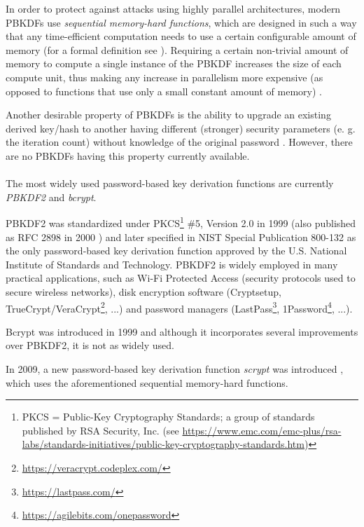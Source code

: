 \documentclass[12pt,oneside]{fithesis2}
\begin{document}
      In order to protect against attacks using highly parallel architectures, modern PBKDFs use \emph{sequential memory-hard functions}, which are designed in such a way that any time-efficient computation needs to use a certain configurable amount of memory (for a formal definition see \cite[chapter 4]{scrypt}). Requiring a certain non-trivial amount of memory to compute a single instance of the PBKDF increases the size of each compute unit, thus making any increase in parallelism more expensive (as opposed to functions that use only a small constant amount of memory) \cite{scrypt}.
      
      Another desirable property of PBKDFs is the ability to upgrade an existing derived key/hash to another having different (stronger) security parameters (e. g. the iteration count) without knowledge of the original password \cite{openwall:pwHashing}. However, there are no PBKDFs having this property currently available.
      
      \paragraph*{}
      The most widely used password-based key derivation functions are currently \emph{PBKDF2} and \emph{bcrypt}.
      
      PBKDF2 was standardized under PKCS\footnote{PKCS = Public-Key Cryptography Standards; a group of standards published by RSA Security, Inc. (see \url{https://www.emc.com/emc-plus/rsa-labs/standards-initiatives/public-key-cryptography-standards.htm})} \#5, Version 2.0 in 1999 (also published as RFC 2898 in 2000 \cite{rfc2898}) and later specified in NIST Special Publication 800-132 \cite{nist:sp800:132} as the only password-based key derivation function approved by the U.S. National Institute of Standards and Technology. PBKDF2 is widely employed in many practical applications, such as Wi-Fi Protected Access (security protocols used to secure wireless networks), disk encryption software (Cryptsetup, TrueCrypt/VeraCrypt\footnote{\url{https://veracrypt.codeplex.com/}}, ...) and password managers (LastPass\footnote{\url{https://lastpass.com/}}, 1Password\footnote{\url{https://agilebits.com/onepassword}}, ...).
      
      Bcrypt was introduced in 1999 \cite{bcrypt} and although it incorporates several improvements over PBKDF2, it is not as widely used.
      
      In 2009, a new password-based key derivation function \emph{scrypt} was introduced \cite{scrypt}, which uses the aforementioned sequential memory-hard functions.
      
\end{document}
